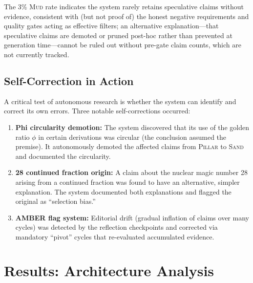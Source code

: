 \documentclass[11pt,a4paper]{article}
\newcommand{\pillar}{\textsc{Pillar}}
\newcommand{\sand}{\textsc{Sand}}
\newcommand{\mud}{\textsc{Mud}}
\begin{document}
The 3\% \mud{} rate indicates the system rarely retains speculative claims without
evidence, consistent with (but not proof of) the honest negative requirements and
quality gates acting as effective filters; an alternative explanation---that
speculative claims are demoted or pruned post-hoc rather than prevented at
generation time---cannot be ruled out without pre-gate claim counts, which are
not currently tracked.


\subsection{Self-Correction in Action}

A critical test of autonomous research is whether the system can identify and correct
its own errors. Three notable self-corrections occurred:

\begin{enumerate}[nosep]
    \item \textbf{Phi circularity demotion:} The system discovered that its use of
          the golden ratio $\phi$ in certain derivations was circular (the conclusion
          assumed the premise). It autonomously demoted the affected claims from
          \pillar{} to \sand{} and documented the circularity.
    \item \textbf{28 continued fraction origin:} A claim about the nuclear magic
          number 28 arising from a continued fraction was found to have an
          alternative, simpler explanation. The system documented both explanations
          and flagged the original as ``selection bias.''
    \item \textbf{AMBER flag system:} Editorial drift (gradual inflation of claims
          over many cycles) was detected by the reflection checkpoints and corrected
          via mandatory ``pivot'' cycles that re-evaluated accumulated evidence.
\end{enumerate}

\section{Results: Architecture Analysis}
\label{sec:results}
\end{document}
